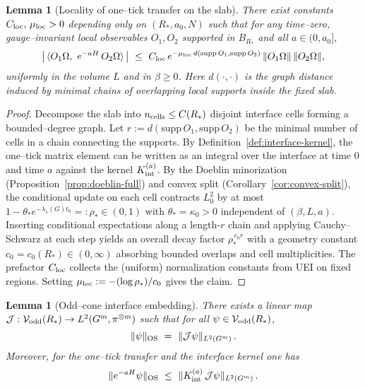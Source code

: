 \documentclass[11pt]{amsart}
\theoremstyle{plain}
\newtheorem{lemma}[theorem]{Lemma}
\theoremstyle{definition}
\theoremstyle{remark}
\begin{document}
\begin{lemma}[Locality of one--tick transfer on the slab]\label{lem:locality-one-tick}
There exist constants $C_{\rm loc},\,\mu_{\rm loc}>0$ depending only on $(R_*,a_0,N)$ such that for any time--zero, gauge--invariant local observables $O_1,O_2$ supported in $B_{R_*}$ and all $a\in(0,a_0]$,
\[
  \big|\,\langle O_1\Omega,\ e^{-aH}\,O_2\Omega\rangle\,\big|\ \le\ C_{\rm loc}\,e^{-\mu_{\rm loc}\, d(\mathrm{supp}\,O_1,\mathrm{supp}\,O_2)}\,\|O_1\Omega\|\,\|O_2\Omega\|,
\]
uniformly in the volume $L$ and in $\beta\ge 0$. Here $d(\cdot,\cdot)$ is the graph distance induced by minimal chains of overlapping local supports inside the fixed slab.
\end{lemma}

\begin{proof}
Decompose the slab into $n_{\rm cells}\le C(R_*)$ disjoint interface cells forming a bounded--degree graph. Let $r:=d(\mathrm{supp}\,O_1,\mathrm{supp}\,O_2)$ be the minimal number of cells in a chain connecting the supports. By Definition~\ref{def:interface-kernel}, the one--tick matrix element can be written as an integral over the interface at time $0$ and time $a$ against the kernel $K_{\rm int}^{(a)}$. By the Doeblin minorization (Proposition~\ref{prop:doeblin-full}) and convex split (Corollary~\ref{cor:convex-split}), the conditional update on each cell contracts $L^2_0$ by at most $1-\theta_* e^{-\lambda_1(G) t_0}=:\rho_*\in(0,1)$ with $\theta_*=\kappa_0>0$ independent of $(\beta,L,a)$. Inserting conditional expectations along a length-$r$ chain and applying Cauchy--Schwarz at each step yields an overall decay factor $\rho_*^{\,c_0 r}$ with a geometry constant $c_0=c_0(R_*)\in(0,\infty)$ absorbing bounded overlaps and cell multiplicities. The prefactor $C_{\rm loc}$ collects the (uniform) normalization constants from UEI on fixed regions. Setting $\mu_{\rm loc}:=-(\log \rho_*)/c_0$ gives the claim.
\end{proof}

\begin{lemma}[Odd--cone interface embedding]\label{lem:odd-cone-embedding}
There exists a linear map $\mathcal J: \mathcal V_{\rm odd}(R_*)\to L^2(G^m,\pi^{\otimes m})$ such that for all $\psi\in \mathcal V_{\rm odd}(R_*)$,
\[
  \|\psi\|_{\rm OS}\ =\ \|\mathcal J \psi\|_{L^2(G^m)}\,.
\]
Moreover, for the one--tick transfer and the interface kernel one has
\[
  \|e^{-aH}\psi\|_{\rm OS}\ \le\ \|K_{\rm int}^{(a)}\, \mathcal J\psi\|_{L^2(G^m)}\,.
\]
\end{lemma}
\end{document}
